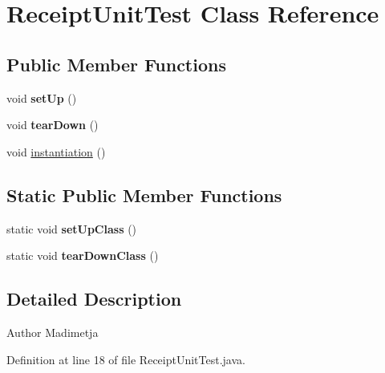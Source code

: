 \hypertarget{class_receipt_unit_test}{\section{Receipt\+Unit\+Test Class Reference}
\label{class_receipt_unit_test}
}
\subsection*{Public Member Functions}
\begin{DoxyCompactItemize}
\item 
\hypertarget{class_receipt_unit_test_aac78b41793c52301090b041a76a7990d}{void {\bfseries set\+Up} ()}\label{class_receipt_unit_test_aac78b41793c52301090b041a76a7990d}

\item 
\hypertarget{class_receipt_unit_test_af07963be2cea104cb428a55a6216fc68}{void {\bfseries tear\+Down} ()}\label{class_receipt_unit_test_af07963be2cea104cb428a55a6216fc68}

\item 
void \hyperlink{class_receipt_unit_test_aab92fcc0a866db8ec56ed65b9693cdc8}{instantiation} ()
\end{DoxyCompactItemize}
\subsection*{Static Public Member Functions}
\begin{DoxyCompactItemize}
\item 
\hypertarget{class_receipt_unit_test_a349b50a6df17f5b573210fab7cb7ed50}{static void {\bfseries set\+Up\+Class} ()}\label{class_receipt_unit_test_a349b50a6df17f5b573210fab7cb7ed50}

\item 
\hypertarget{class_receipt_unit_test_a16caf64de74462999a3e508979cb4438}{static void {\bfseries tear\+Down\+Class} ()}\label{class_receipt_unit_test_a16caf64de74462999a3e508979cb4438}

\end{DoxyCompactItemize}


\subsection{Detailed Description}
\begin{DoxyAuthor}{Author}
Madimetja 
\end{DoxyAuthor}


Definition at line 18 of file Receipt\+Unit\+Test.\+java.



